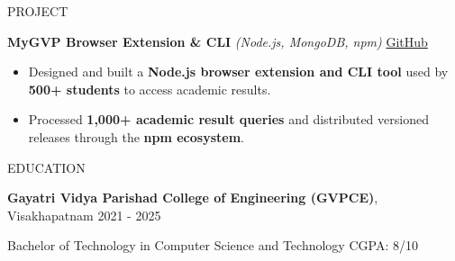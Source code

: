 \documentclass{resume}
\begin{document}
\begin{rSection}{PROJECT}

\item
\textbf{MyGVP Browser Extension \& CLI} \textit{(Node.js, MongoDB, npm)} \hfill \href{https://github.com/kumarram27/gvp}{GitHub}

\begin{itemize}
\itemsep -4pt

\item Designed and built a \textbf{Node.js browser extension and CLI tool} used by \textbf{500+ students} to access academic results.

\item Processed \textbf{1,000+ academic result queries} and distributed versioned releases through the \textbf{npm ecosystem}.

\end{itemize}

\end{rSection}

\begin{rSection}{EDUCATION}

\textbf{Gayatri Vidya Parishad College of Engineering (GVPCE)}, Visakhapatnam
\hfill 2021 - 2025

Bachelor of Technology in Computer Science and Technology
\hfill CGPA: 8/10

\end{rSection}

\end{document}
